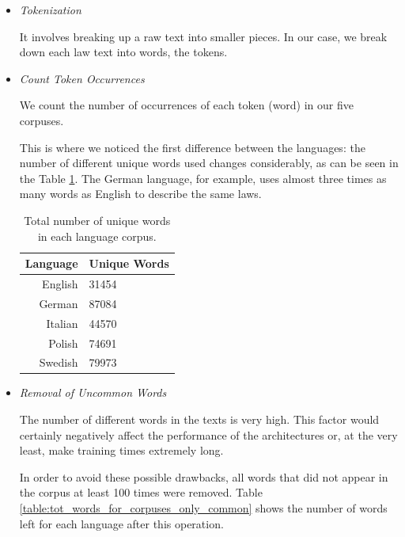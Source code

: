 \documentclass[letterpaper,11pt]{article}
\begin{document}
\begin{itemize}
  \item \textit{Tokenization}
  
  It involves breaking up a raw text into smaller pieces. In our case, we break down each law text into words, the tokens. 

  \item \textit{Count Token Occurrences}
  
  We count the number of occurrences of each token (word) in our five corpuses.

  This is where we noticed the first difference between the languages: the number of different unique words used changes considerably, as can be seen in the Table \ref{table:tot_words_for_corpuses}. The German language, for example, uses almost three times as many words as English to describe the same laws.

 \begin{table}[H]
    \centering
    \begin{tabular}{@{}rl@{}}
    \toprule
    \multicolumn{1}{c}{\textbf{Language}} & \textbf{Unique Words} \\ \midrule
    English                               & 31454                 \\
    German                                & 87084                 \\
    Italian                               & 44570                 \\
    Polish                                & 74691                 \\
    Swedish                               & 79973                 \\ \bottomrule
    \end{tabular}
    \caption{Total number of unique words in each language corpus.}
    \label{table:tot_words_for_corpuses}
    \end{table}


  \item \textit{Removal of Uncommon Words}
  
  The number of different words in the texts is very high. This factor would certainly negatively affect the performance of the architectures or, at the very least, make training times extremely long. 
  
  In order to avoid these possible drawbacks, all words that did not appear in the corpus at least 100 times were removed. Table \ref{table:tot_words_for_corpuses_only_common} shows the number of words left for each language after this operation.
  

\end{itemize}
\end{document}
